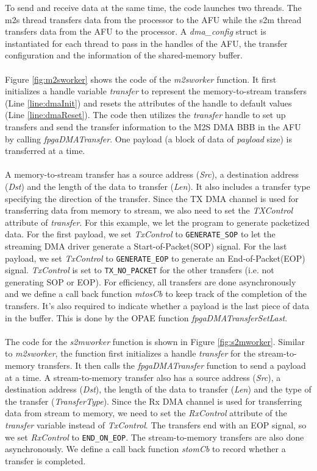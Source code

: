 \documentclass[11pt, twoside, pdftex]{article}
\begin{document}
 \noindent
  To send and receive data at the same time, the code launches two threads. The m2s thread transfers data from the processor to the AFU while the s2m thread transfers data from the AFU to the processor. A {\it dma\_config} struct is instantiated for each thread to pass in the handles of the AFU, the transfer configuration and the information of the shared-memory buffer.\\
 \\
 Figure \ref{fig:m2sworker} shows the code of the {\it m2sworker} function. It first initializes a handle variable {\it transfer} to represent the memory-to-stream transfers (Line \ref{line:dmaInit}) and resets the attributes of the handle to default values (Line \ref{line:dmaReset}). The code then utilizes the {\it transfer} handle to set up transfers and send the transfer information to the M2S DMA BBB in the AFU by calling {\it fpgaDMATransfer}. One payload (a block of data of \emph{payload} size) is transferred at a time.\\
 \\
 A memory-to-stream transfer has a source address ({\it Src}), a destination address ({\it Dst}) and the length of the data to transfer ({\it Len}). It also includes a transfer type specifying the direction of the transfer. Since the TX DMA channel is used for transferring data from memory to stream, we also need to set the {\it TXControl} attribute of {\it transfer}. For this example, we let the program to generate packetized data. For the first payload, we set {\it TxControl} to \verb|GENERATE_SOP| to let the streaming DMA driver generate a Start-of-Packet(SOP) signal. For the last payload, we set {\it TxControl} to \verb|GENERATE_EOP| to generate an End-of-Packet(EOP) signal. {\it TxControl} is set to \verb|TX_NO_PACKET| for the other transfers (i.e. not generating SOP or EOP). For efficiency, all transfers are done asynchronously and we define a call back function {\it mtosCb} to keep track of the completion of the transfers. It's also required to indicate whether a payload is the last piece of data in the buffer. This is done by the OPAE function {\it fpgaDMATransferSetLast}. \\
 \\
 The code for the {\it s2mworker} function is shown in Figure \ref{fig:s2mworker}. Similar to {\it m2sworker}, the function first initializes a handle {\it transfer} for the stream-to-memory transfers. It then calls the {\it fpgaDMATransfer} function to send a payload at a time. A stream-to-memory transfer also has a source address ({\it Src}), a destination address ({\it Dst}), the length of the data to transfer ({\it Len}) and the type of the transfer ({\it TransferType}). Since the Rx DMA channel is used for transferring data from stream to memory, we need to set the {\it RxControl} attribute of the {\it transfer} variable instead of {\it TxControl}. The transfers end with an EOP signal, so we set {\it RxControl} to \verb|END_ON_EOP|. The stream-to-memory transfers are also done asynchronously. We define a call back function {\it stomCb} to record whether a transfer is completed. \\
\end{document}
